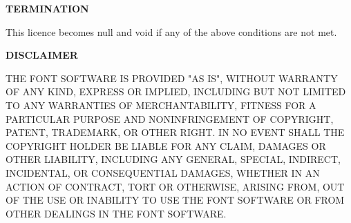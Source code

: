 {\bf TERMINATION}

This licence becomes null and void if any of the above conditions are not met.

{\bf DISCLAIMER}

THE FONT SOFTWARE IS PROVIDED "AS IS", WITHOUT WARRANTY OF ANY KIND, EXPRESS OR IMPLIED, INCLUDING BUT NOT LIMITED TO ANY WARRANTIES OF MERCHANTABILITY, FITNESS FOR A PARTICULAR PURPOSE AND NONINFRINGEMENT OF COPYRIGHT, PATENT, TRADEMARK, OR OTHER RIGHT. IN NO EVENT SHALL THE COPYRIGHT HOLDER BE LIABLE FOR ANY CLAIM, DAMAGES OR OTHER LIABILITY, INCLUDING ANY GENERAL, SPECIAL, INDIRECT, INCIDENTAL, OR CONSEQUENTIAL DAMAGES, WHETHER IN AN ACTION OF CONTRACT, TORT OR OTHERWISE, ARISING FROM, OUT OF THE USE OR INABILITY TO USE THE FONT SOFTWARE OR FROM OTHER DEALINGS IN THE FONT SOFTWARE.

